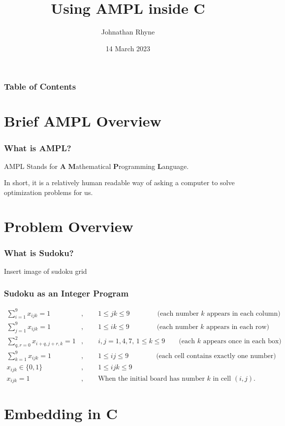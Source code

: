 \documentclass{beamer}
\title{Using AMPL inside C}
\author{Johnathan Rhyne}
\institute{CU Denver}
\date{14 March 2023}
\begin{document}
    \frame{\titlepage}
    \begin{frame}
        \frametitle{Table of Contents}
        \tableofcontents
    \end{frame}
    \section{Brief AMPL Overview}
    \begin{frame}
        \frametitle{What is AMPL?}
        AMPL Stands for \textbf{A} \textbf{M}athematical \textbf{P}rogramming \textbf{L}anguage.

        In short, it is a relatively
        human readable way of asking a computer to solve optimization problems for us.
    \end{frame}
    \section{Problem Overview}
    \begin{frame}
        \frametitle{What is Sudoku?}
        Insert image of sudoku grid 
    \end{frame}
    \begin{frame}
        \frametitle{Sudoku as an Integer Program}
        \footnotesize
        \begin{align*}
            \sum_{i=1}^9 x_{ijk} = 1&,\qquad 1\leq jk\leq 9\qquad\qquad\text{(each number $k$ appears in each column)}\\
            \sum_{j=1}^9 x_{ijk} = 1&,\qquad 1\leq ik\leq 9\qquad\qquad\text{(each number $k$ appears in each row)} \\
            \sum_{q,r=0}^2x_{i+q,j+r,k} = 1&, \qquad i,j=1,4,7,\, 1\leq k \leq 9 \qquad\text{(each $k$ appears once in each box)}\\
            \sum_{k=1}^9 x_{ijk} = 1&,\qquad 1\leq ij\leq 9\qquad\qquad\text{(each cell contains exactly one number)} \\
            x_{ijk}\in\{0,1\} &, \qquad 1\leq ijk\leq 9 \\
            x_{ijk} = 1 &,  \qquad\text{When the initial board has number $k$ in cell $(i,j)$.}
        \end{align*}
    \end{frame}
    \section{Embedding in C}
\end{document}
